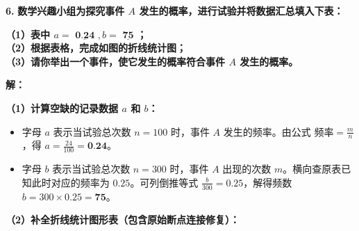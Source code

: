 \vspace{0.6cm}

\textbf{\LARGE 6.} \textbf{数学兴趣小组为探究事件 $A$ 发生的概率，进行试验并将数据汇总填入下表：}

\vspace{0.3cm}
\begin{center}
\renewcommand{\arraystretch}{1.8}
\end{center}

\vspace{0.4cm}
\textbf{（1）表中 $a = \underline{\textbf{  0.24  }}, b = \underline{\textbf{  75  }}$；\\
（2）根据表格，完成如图的折线统计图；\\
（3）请你举出一个事件，使它发生的概率符合事件 $A$ 发生的概率。}

\vspace{0.4cm}
\textbf{解：}

\textbf{（1）计算空缺的记录数据 $a$ 和 $b$：}
\begin{itemize}
    \item 字母 $a$ 表示当试验总次数 $n=100$ 时，事件 $A$ 发生的频率。由公式 $\text{频率} = \frac{m}{n}$，得 $a = \frac{24}{100} = \textbf{0.24}$。
    \item 字母 $b$ 表示当试验总次数 $n=300$ 时，事件 $A$ 出现的次数 $m$。横向查原表已知此时对应的频率为 $0.25$。可列倒推等式 $\frac{b}{300} = 0.25$，解得频数 $b = 300 \times 0.25 = \textbf{75}$。
\end{itemize}

\textbf{（2）补全折线统计图形表（包含原始断点连接修复）：}


